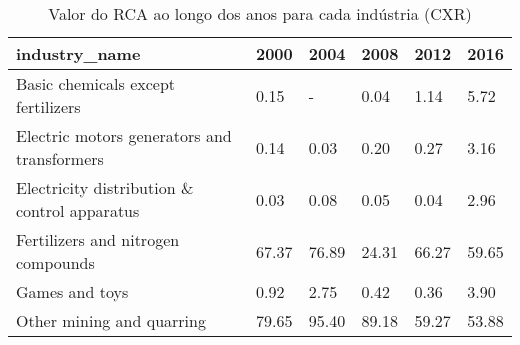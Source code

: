 \begin{table}
\centering
\caption{Valor do RCA ao longo dos anos para cada indústria (CXR)}
\begin{tabular}{p{6cm}p{1.5cm}p{1.5cm}p{1.5cm}p{1.5cm}p{1.5cm}}
\toprule
                               industry\_name &  2000 &  2004 &  2008 &  2012 &  2016 \\
\midrule
          Basic chemicals except fertilizers &  0.15 &     - &  0.04 &  1.14 &  5.72 \\
 Electric motors generators and transformers &  0.14 &  0.03 &  0.20 &  0.27 &  3.16 \\
Electricity distribution \& control apparatus &  0.03 &  0.08 &  0.05 &  0.04 &  2.96 \\
          Fertilizers and nitrogen compounds & 67.37 & 76.89 & 24.31 & 66.27 & 59.65 \\
                              Games and toys &  0.92 &  2.75 &  0.42 &  0.36 &  3.90 \\
                   Other mining and quarring & 79.65 & 95.40 & 89.18 & 59.27 & 53.88 \\
\bottomrule
\end{tabular}
\end{table}

